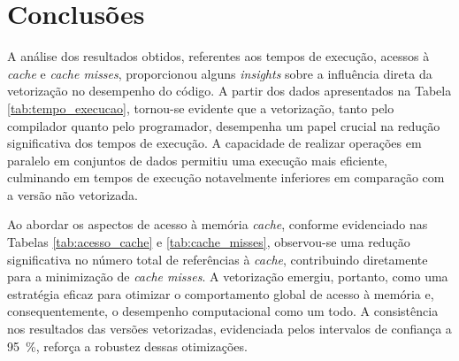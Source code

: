 \documentclass[12pt,a4paper]{article}
\begin{document}
\section{Conclusões}

A análise dos resultados obtidos, referentes aos tempos de execução, acessos à \textit{cache} e \textit{cache misses}, proporcionou alguns \textit{insights} sobre a influência direta da vetorização no desempenho do código. A partir dos dados apresentados na Tabela \ref{tab:tempo_execucao}, tornou-se evidente que a vetorização, tanto pelo compilador quanto pelo programador, desempenha um papel crucial na redução significativa dos tempos de execução. A capacidade de realizar operações em paralelo em conjuntos de dados permitiu uma execução mais eficiente, culminando em tempos de execução notavelmente inferiores em comparação com a versão não vetorizada.

Ao abordar os aspectos de acesso à memória \textit{cache}, conforme evidenciado nas Tabelas \ref{tab:acesso_cache} e \ref{tab:cache_misses}, observou-se uma redução significativa no número total de referências à \textit{cache}, contribuindo diretamente para a minimização de \textit{cache misses}. A vetorização emergiu, portanto, como uma estratégia eficaz para otimizar o comportamento global de acesso à memória e, consequentemente, o desempenho computacional como um todo. A consistência nos resultados das versões vetorizadas, evidenciada pelos intervalos de confiança a \SI{95}{\percent}, reforça a robustez dessas otimizações.
\end{document}
